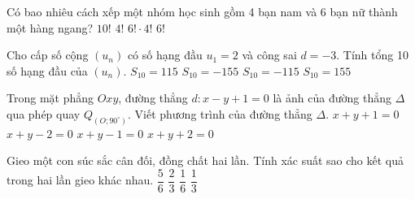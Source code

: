 \begin{ex}%
	Có bao nhiêu cách xếp một nhóm học sinh gồm 4 bạn nam và 6 bạn nữ thành một hàng ngang?
	\choice
	{\True $10! $}
	{$4!$}
	{$6!\cdot 4!$}
	{$6! $}
\end{ex}
\begin{ex}%
	Cho cấp số cộng $\left(u_n\right)$ có số hạng đầu $u_1=2$ và công sai $d=-3$. Tính tổng 10 số hạng đầu của $\left({u_n}\right)$.
	\choice
	{$S_{10}=115 $}
	{$S_{10}=-155 $}
	{\True $S_{10}=-115 $}
	{$S_{10}=155 $}
\end{ex}
\begin{ex}%
	Trong mặt phẳng $Oxy$, đường thẳng $d: x-y+1=0$ là ảnh của đường thẳng $\Delta$ qua phép quay $Q_{\left(O;90^\circ\right)}$. Viết phương trình của đường thẳng $\Delta$.
	\choice
	{$x+y+1=0 $}
	{$x+y-2=0 $}
	{\True $x+y-1=0 $}
	{$x+y+2=0 $}
\end{ex}
\begin{ex}%
	Gieo một con súc sắc cân đối, đồng chất hai lần. Tính xác suất sao cho kết quả trong hai lần gieo khác nhau.
	\choice
	{\True $\dfrac{5}{6} $}
	{$\dfrac{2}{3} $}
	{$\dfrac{1}{6} $}
	{$\dfrac{1}{3} $}
\end{ex}
